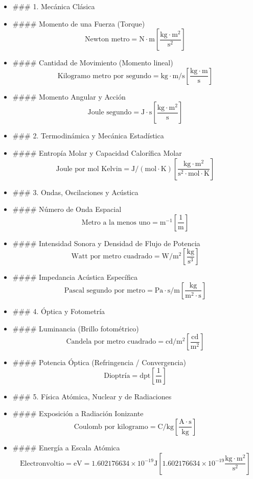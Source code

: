 \documentclass[11pt,a4paper]{article}
\begin{document}
\begin{itemize}
  \item \#\#\# 1. Mecánica Clásica
  \item \#\#\#\# Momento de una Fuerza (Torque)
  \[
    \text{Newton metro} = \mathrm{N}\cdot\mathrm{m} \left[\frac{\mathrm{kg}\cdot\mathrm{m}^2}{\mathrm{s}^2}\right]
  \]
  \item \#\#\#\# Cantidad de Movimiento (Momento lineal)
  \[
    \text{Kilogramo metro por segundo} = \mathrm{kg}\cdot\mathrm{m}/\mathrm{s} \left[\frac{\mathrm{kg}\cdot\mathrm{m}}{\mathrm{s}}\right]
  \]
  \item \#\#\#\# Momento Angular y Acción
  \[
    \text{Joule segundo} = \mathrm{J}\cdot\mathrm{s} \left[\frac{\mathrm{kg}\cdot\mathrm{m}^2}{\mathrm{s}}\right]
  \]
  \item \#\#\# 2. Termodinámica y Mecánica Estadística
  \item \#\#\#\# Entropía Molar y Capacidad Calorífica Molar
  \[
    \text{Joule por mol Kelvin} = \mathrm{J}/(\mathrm{mol}\cdot\mathrm{K}) \left[\frac{\mathrm{kg}\cdot\mathrm{m}^2}{\mathrm{s}^2\cdot\mathrm{mol}\cdot\mathrm{K}}\right]
  \]
  \item \#\#\# 3. Ondas, Oscilaciones y Acústica
  \item \#\#\#\# Número de Onda Espacial
  \[
    \text{Metro a la menos uno} = \mathrm{m}^{-1} \left[\frac{1}{\mathrm{m}}\right]
  \]
  \item \#\#\#\# Intensidad Sonora y Densidad de Flujo de Potencia
  \[
    \text{Watt por metro cuadrado} = \mathrm{W}/\mathrm{m}^2 \left[\frac{\mathrm{kg}}{\mathrm{s}^3}\right]
  \]
  \item \#\#\#\# Impedancia Acústica Específica
  \[
    \text{Pascal segundo por metro} = \mathrm{Pa}\cdot\mathrm{s}/\mathrm{m} \left[\frac{\mathrm{kg}}{\mathrm{m}^2\cdot\mathrm{s}}\right]
  \]
  \item \#\#\# 4. Óptica y Fotometría
  \item \#\#\#\# Luminancia (Brillo fotométrico)
  \[
    \text{Candela por metro cuadrado} = \mathrm{cd}/\mathrm{m}^2 \left[\frac{\mathrm{cd}}{\mathrm{m}^2}\right]
  \]
  \item \#\#\#\# Potencia Óptica (Refringencia / Convergencia)
  \[
    \text{Dioptría} = \mathrm{dpt} \left[\frac{1}{\mathrm{m}}\right]
  \]
  \item \#\#\# 5. Física Atómica, Nuclear y de Radiaciones
  \item \#\#\#\# Exposición a Radiación Ionizante
  \[
    \text{Coulomb por kilogramo} = \mathrm{C}/\mathrm{kg} \left[\frac{\mathrm{A}\cdot\mathrm{s}}{\mathrm{kg}}\right]
  \]
  \item \#\#\#\# Energía a Escala Atómica
  \[
    \text{Electronvoltio} = \mathrm{eV} = 1.602176634 \times 10^{-19}\mathrm{ J} \left[1.602176634 \times 10^{-19}\frac{\mathrm{kg}\cdot\mathrm{m}^2}{\mathrm{s}^2}\right]
  \]
\end{itemize}
\end{document}
